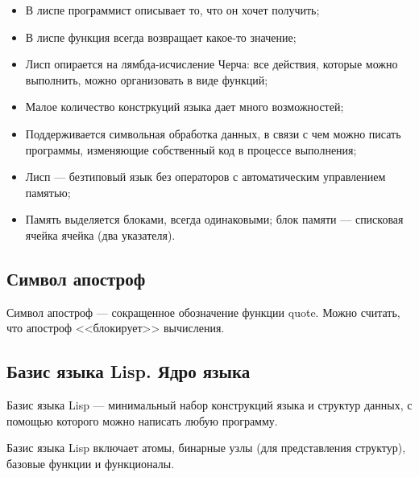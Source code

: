 \documentclass[a4paper,oneside,14pt]{extarticle}
\begin{document}
\begin{itemize}
    \item В лиспе программист описывает то, что он хочет получить;
    \item В лиспе функция всегда возвращает какое-то значение;
    \item Лисп опирается на лямбда-исчисление Черча: все действия, которые можно выполнить, можно организовать в виде функций;
    \item Малое количество констркуций языка дает много возможностей;
    \item Поддерживается символьная обработка данных, в связи с чем можно писать программы, изменяющие собственный код в процессе выполнения;
    \item Лисп --- безтиповый язык без операторов с автоматическим управлением памятью;
    \item Память выделяется блоками, всегда одинаковыми; блок памяти --- списковая ячейка ячейка (два указателя).
\end{itemize}


\subsection{Символ апостроф}

Символ апостроф --- сокращенное обозначение функции quote.
Можно считать, что апостроф <<блокирует>> вычисления.

\subsection{Базис языка Lisp. Ядро языка}

Базис языка Lisp --- минимальный набор конструкций языка и структур данных, с помощью которого можно написать любую программу.

Базис языка Lisp включает атомы, бинарные узлы (для представления структур), базовые функции и функционалы.

\end{document}
